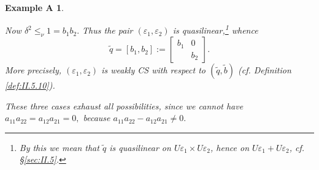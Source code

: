 \documentclass [12pt,a4paper,reqno]{amsart}
\newtheorem*{exampleA*}{Example A}
\begin{document}
\begin{exampleA*}
\begin{description}
Now $\delta^2\le_\nu1=b_1b_2.$ Thus the pair $({\varepsilon}_1,{\varepsilon}_2)$ is quasilinear,\footnote{By this we mean that ${\tilde q}$ is quasilinear on $U{\varepsilon}_1\times U{\varepsilon}_2$, hence on  $U{\varepsilon}_1 +  U{\varepsilon}_2$, cf. \S\ref{sec:II.5}.}
whence
$${\tilde q}=[b_1,b_2]:=\begin{bmatrix} b_1 &0\\  & b_2\end{bmatrix}.$$
More precisely, $({\varepsilon}_1,{\varepsilon}_2)$ is weakly CS with respect to $({\tilde q},{\tilde b})$ (cf. Definition~ \ref{def:II.5.10}).

\end{description}
These three cases exhaust all possibilities, since we cannot have $a_{11}a_{22}=a_{12}a_{21}=0,$ because $a_{11}a_{22}-a_{12}a_{21}\ne0.$
\end{exampleA*}
\end{document}
